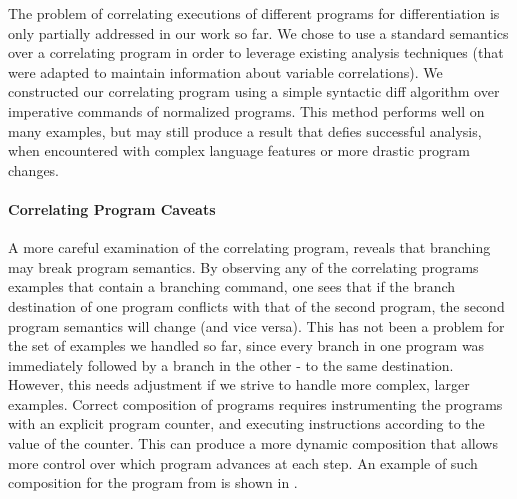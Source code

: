 The problem of correlating executions of different programs for differentiation is only partially addressed in our work so far. We chose to use a standard semantics over a correlating program in order to leverage existing analysis techniques (that were adapted to maintain information about variable correlations). We constructed our correlating program using a simple syntactic diff algorithm over imperative commands of normalized programs. This method performs well on many examples, but may still produce a result that defies successful analysis, when encountered with complex language features or more drastic program changes.

\paragraph{Correlating Program Caveats}
A more careful examination of the correlating program, reveals that branching may break program semantics. By observing any of the correlating programs examples that contain a branching  command, one sees that if the branch destination of one program conflicts with that of the second program, the second program semantics will change (and vice versa). This has not been a problem for the set of examples we handled so far, since every branch in one program was immediately followed by a branch in the other - to the same destination. However, this needs adjustment if we strive to handle more complex, larger examples. Correct composition of programs requires instrumenting the programs with an explicit program counter, and executing instructions according to the value of the counter. This can produce a more dynamic composition that allows more control over which program advances at each step. An example of such composition for the program from  is shown in .

